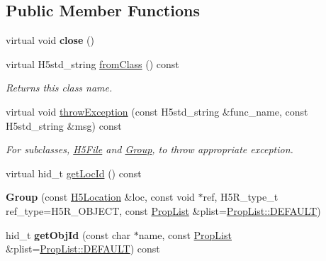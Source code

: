 \subsection*{Public Member Functions}
\begin{DoxyCompactItemize}
\item 
\mbox{\label{class_h5_1_1_group_a4f123da519267973f895b46dd515a960}} 
virtual void {\bfseries close} ()
\item 
\mbox{\label{class_h5_1_1_group_abb4ed8f72b879befe5bd125b64c07c8a}} 
virtual H5std\+\_\+string \hyperlink{class_h5_1_1_group_abb4ed8f72b879befe5bd125b64c07c8a}{from\+Class} () const
\begin{DoxyCompactList}\small\item\em Returns this class name. \end{DoxyCompactList}\item 
\mbox{\label{class_h5_1_1_group_ae6ad54088b635a3c48f2b0eb3d51ecca}} 
virtual void \hyperlink{class_h5_1_1_group_ae6ad54088b635a3c48f2b0eb3d51ecca}{throw\+Exception} (const H5std\+\_\+string \&func\+\_\+name, const H5std\+\_\+string \&msg) const
\begin{DoxyCompactList}\small\item\em For subclasses, \hyperlink{class_h5_1_1_h5_file}{H5\+File} and \hyperlink{class_h5_1_1_group}{Group}, to throw appropriate exception. \end{DoxyCompactList}\item 
virtual hid\+\_\+t \hyperlink{class_h5_1_1_group_ae8fa39e9d934d254cd1bc2302a7e6391}{get\+Loc\+Id} () const
\item 
\mbox{\label{class_h5_1_1_group_abaaaa49f82fc2f69b46b5d56c461be85}} 
{\bfseries Group} (const \hyperlink{class_h5_1_1_h5_location}{H5\+Location} \&loc, const void $\ast$ref, H5\+R\+\_\+type\+\_\+t ref\+\_\+type=H5\+R\+\_\+\+O\+B\+J\+E\+CT, const \hyperlink{class_h5_1_1_prop_list}{Prop\+List} \&plist=\hyperlink{class_h5_1_1_prop_list_ae52af66ce82af0ea7e6dc57148c56241}{Prop\+List\+::\+D\+E\+F\+A\+U\+LT})
\item 
\mbox{\label{class_h5_1_1_group_aea81a1431e9929994a4c1dfe3814f41e}} 
hid\+\_\+t {\bfseries get\+Obj\+Id} (const char $\ast$name, const \hyperlink{class_h5_1_1_prop_list}{Prop\+List} \&plist=\hyperlink{class_h5_1_1_prop_list_ae52af66ce82af0ea7e6dc57148c56241}{Prop\+List\+::\+D\+E\+F\+A\+U\+LT}) const

\end{DoxyCompactItemize}
